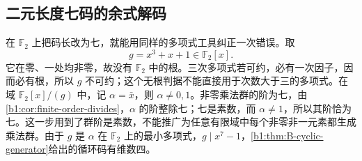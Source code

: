 \subsection{二元长度七码的余式解码}
\label{b1:subsec:B02:03}

在 \(\mathbb F_2\) 上把码长改为七，就能用同样的多项式工具纠正一次错误。取
\[
	g=x^3+x+1\in\mathbb F_2[x].
\]
它在零、一处均非零，故没有 \(\mathbb F_2\) 中的根。三次多项式若可约，必有一次因子，因而必有根，所以 \(g\) 不可约；这个无根判据不能直接用于次数大于三的多项式。在域 \(\mathbb F_2[x]/(g)\) 中，记 \(\alpha=\bar x\)，则 \(\alpha\ne0,1\)。非零乘法群的阶为七，由\cref{b1:cor:finite-order-divides}，\(\alpha\) 的阶整除七；七是素数，而 \(\alpha\ne1\)，所以其阶恰为七。这一步用到了群阶是素数，不能推广为任意有限域中每个非零非一元素都生成乘法群。由于 \(g\) 是 \(\alpha\) 在 \(\mathbb F_2\) 上的最小多项式，\(g\mid x^7-1\)，\cref{b1:thm:B-cyclic-generator}给出的循环码有维数四。

